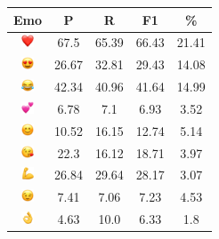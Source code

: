 \documentclass{article}
\begin{document}
\begin{table}
\centering
\begin{tabular}{|c|ccc|c|} \hline
\textbf{Emo} & \textbf{P} & \textbf{R} & \textbf{F1} & \textbf{\%} \\ \hline
\includegraphics[height=0.37cm,width=0.37cm]{img/red_heart.png} & 67.5 & 65.39 & 66.43 & 21.41\\ 
\includegraphics[height=0.37cm,width=0.37cm]{img/smiling_face_with_hearteyes.png} & 26.67 & 32.81 & 29.43 & 14.08\\ 
\includegraphics[height=0.37cm,width=0.37cm]{img/face_with_tears_of_joy.png} & 42.34 & 40.96 & 41.64 & 14.99\\ 
\includegraphics[height=0.37cm,width=0.37cm]{img/two_hearts.png} & 6.78 & 7.1 & 6.93 & 3.52\\ 
\includegraphics[height=0.37cm,width=0.37cm]{img/smiling_face_with_smiling_eyes.png} & 10.52 & 16.15 & 12.74 & 5.14\\ 
\includegraphics[height=0.37cm,width=0.37cm]{img/face_blowing_a_kiss.png} & 22.3 & 16.12 & 18.71 & 3.97\\ 
\includegraphics[height=0.37cm,width=0.37cm]{img/flexed_biceps.png} & 26.84 & 29.64 & 28.17 & 3.07\\ 
\includegraphics[height=0.37cm,width=0.37cm]{img/winking_face.png} & 7.41 & 7.06 & 7.23 & 4.53\\ 
\includegraphics[height=0.37cm,width=0.37cm]{img/OK_hand.png} & 4.63 & 10.0 & 6.33 & 1.8\\ 

\end{tabular}
\end{table}
\end{document}
